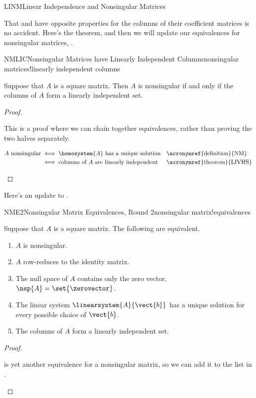 \begin{subsect}{LINM}{Linear Independence and Nonsingular Matrices}
%
\begin{para}That  and  have opposite properties for the columns of their coefficient matrices is no accident.  Here's the theorem, and then we will update our equivalences for nonsingular matrices, .\end{para}
%
\begin{theorem}{NMLIC}{Nonsingular Matrices have Linearly Independent Columns}{nonsingular matrices!linearly independent columns}
\begin{para}Suppose that $A$ is a square matrix.  Then $A$ is nonsingular if and only if the columns of $A$ form a linearly independent set.\end{para}
\end{theorem}
%
\begin{proof}
\begin{para}This is a proof where we can chain together equivalences, rather than proving the two halves separately.
\end{para}
%
\begin{para}
\begin{align*}
\text{$A$ nonsingular}&\iff\text{$\homosystem{A}$ has a unique solution}&&\text{\acronymref{definition}{NM}}\\
&\iff\text{columns of $A$ are linearly independent}&&\text{\acronymref{theorem}{LIVHS}}\\
\end{align*}
\end{para}
%
\end{proof}
%
\begin{para}Here's an update to .
\end{para}
%
\begin{theorem}{NME2}{Nonsingular Matrix Equivalences, Round 2}{nonsingular matrix!equivalences}
\begin{para}Suppose that $A$ is a square matrix.  The following are equivalent.
%
\begin{enumerate}
\item $A$ is nonsingular.
\item $A$ row-reduces to the identity matrix.
\item The null space of $A$ contains only the zero vector, $\nsp{A}=\set{\zerovector}$.
\item The linear system $\linearsystem{A}{\vect{b}}$ has a unique solution for every possible choice of $\vect{b}$.
\item The columns of $A$ form a linearly independent set.
\end{enumerate}
\end{para}
\end{theorem}
%
\begin{proof}
\begin{para} is yet another equivalence for a nonsingular matrix, so we can add it to the list in .\end{para}
\end{proof}
%
%
\end{subsect}
